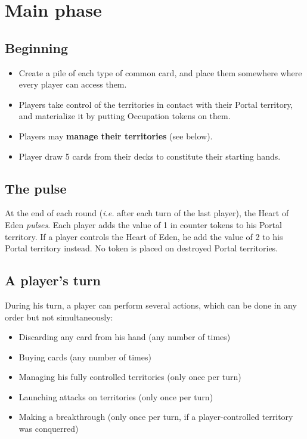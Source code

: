 \documentclass[a4paper]{article}
\begin{document}
\newpage
\section{Main phase}

  \subsection{Beginning}
  
  	\begin{itemize}
        \item Create a pile of each type of common card,
            and place them somewhere where every player can access them.
        \item Players take control of the territories in contact with their Portal
        territory, and materialize it by putting Occupation tokens on them.
        \item Players may \textbf{manage their territories} (see below).
        \item Player draw 5 cards from their decks to constitute their starting hands.
    \end{itemize}
    
  \subsection{The pulse}
  
  	At the end of each round (\textit{i.e.} after each turn of the last player),
  	the Heart of Eden \textit{pulses}.
  	Each player adds the value of 1 in counter tokens to his Portal territory.
  	If a player controls the Heart of Eden, he add the value of 2
        to his Portal territory instead.
  	No token is placed on destroyed Portal territories.


  \subsection{A player's turn}

    \hspace{-2em} During his turn, a player can perform several actions,
    which can be done in any order but not simultaneously:
    \vspace{-1.3em}
    \begin{itemize}
        \item Discarding any card from his hand (any number of times)
        \item Buying cards (any number of times)
        \item Managing his fully controlled territories (only once per turn)
        \item Launching attacks on territories (only once per turn)
        \item Making a breakthrough (only once per turn,
        if a player-controlled territory was conquerred)
    \end{itemize}
    
\end{document}
